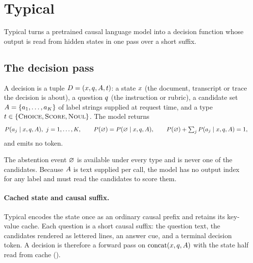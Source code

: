 \section{Typical}
\label{sec:method}

Typical turns a pretrained causal language model into a decision function whose output is read from hidden
states in one pass over a short suffix.

\subsection{The decision pass}
\label{sec:method:task}

\begin{definition}
\label{def:task}
A decision is a tuple $D = (x, q, A, t)$: a state $x$ (the document,
transcript or trace the decision is about), a question $q$ (the instruction or rubric), a candidate
set $A = \{a_{1},\dots,a_{K}\}$ of label strings supplied at request time, and a type
$t \in \{\textsc{Choice}, \textsc{Score}, \textsc{Noul}\}$. The model returns
\[
  P(a_{j} \mid x, q, A),\ j = 1,\dots,K,
  \qquad
  P(\varnothing) = P(\varnothing \mid x, q, A),
  \qquad
  P(\varnothing) + \textstyle\sum_{j} P(a_{j} \mid x, q, A) = 1,
\]
and emits no token.
\end{definition}

The abstention event $\varnothing$ is available under every type and is never one of the candidates.
Because $A$ is text supplied per call, the model has no output index for any label and must read the
candidates to score them.

\paragraph{Cached state and causal suffix.}
\label{sec:method:pass}
Typical encodes the state once as an ordinary causal prefix and retains its key-value cache. Each question
is a short causal suffix: the question text, the candidates rendered as lettered lines, an answer cue, and
a terminal decision token. A decision is therefore a forward pass on $\mathrm{concat}(x, q,
A)$ with the state half read from cache ().

